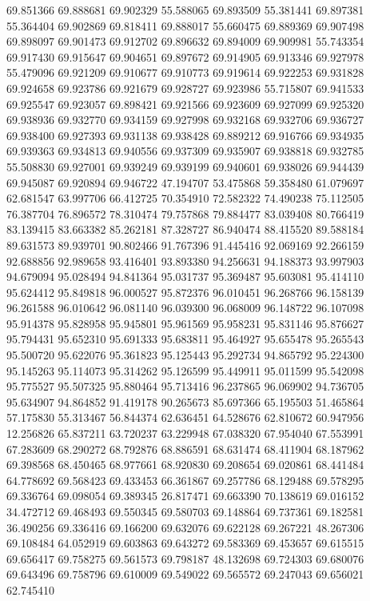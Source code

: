 69.851366
69.888681
69.902329
55.588065
69.893509
55.381441
69.897381
55.364404
69.902869
69.818411
69.888017
55.660475
69.889369
69.907498
69.898097
69.901473
69.912702
69.896632
69.894009
69.909981
55.743354
69.917430
69.915647
69.904651
69.897672
69.914905
69.913346
69.927978
55.479096
69.921209
69.910677
69.910773
69.919614
69.922253
69.931828
69.924658
69.923786
69.921679
69.928727
69.923986
55.715807
69.941533
69.925547
69.923057
69.898421
69.921566
69.923609
69.927099
69.925320
69.938936
69.932770
69.934159
69.927998
69.932168
69.932706
69.936727
69.938400
69.927393
69.931138
69.938428
69.889212
69.916766
69.934935
69.939363
69.934813
69.940556
69.937309
69.935907
69.938818
69.932785
55.508830
69.927001
69.939249
69.939199
69.940601
69.938026
69.944439
69.945087
69.920894
69.946722
47.194707
53.475868
59.358480
61.079697
62.681547
63.997706
66.412725
70.354910
72.582322
74.490238
75.112505
76.387704
76.896572
78.310474
79.757868
79.884477
83.039408
80.766419
83.139415
83.663382
85.262181
87.328727
86.940474
88.415520
89.588184
89.631573
89.939701
90.802466
91.767396
91.445416
92.069169
92.266159
92.688856
92.989658
93.416401
93.893380
94.256631
94.188373
93.997903
94.679094
95.028494
94.841364
95.031737
95.369487
95.603081
95.414110
95.624412
95.849818
96.000527
95.872376
96.010451
96.268766
96.158139
96.261588
96.010642
96.081140
96.039300
96.068009
96.148722
96.107098
95.914378
95.828958
95.945801
95.961569
95.958231
95.831146
95.876627
95.794431
95.652310
95.691333
95.683811
95.464927
95.655478
95.265543
95.500720
95.622076
95.361823
95.125443
95.292734
94.865792
95.224300
95.145263
95.114073
95.314262
95.126599
95.449911
95.011599
95.542098
95.775527
95.507325
95.880464
95.713416
96.237865
96.069902
94.736705
95.634907
94.864852
91.419178
90.265673
85.697366
65.195503
51.465864
57.175830
55.313467
56.844374
62.636451
64.528676
62.810672
60.947956
12.256826
65.837211
63.720237
63.229948
67.038320
67.954040
67.553991
67.283609
68.290272
68.792876
68.886591
68.631474
68.411904
68.187962
69.398568
68.450465
68.977661
68.920830
69.208654
69.020861
68.441484
64.778692
69.568423
69.433453
66.361867
69.257786
68.129488
69.578295
69.336764
69.098054
69.389345
26.817471
69.663390
70.138619
69.016152
34.472712
69.468493
69.550345
69.580703
69.148864
69.737361
69.182581
36.490256
69.336416
69.166200
69.632076
69.622128
69.267221
48.267306
69.108484
64.052919
69.603863
69.643272
69.583369
69.453657
69.615515
69.656417
69.758275
69.561573
69.798187
48.132698
69.724303
69.680076
69.643496
69.758796
69.610009
69.549022
69.565572
69.247043
69.656021
62.745410
